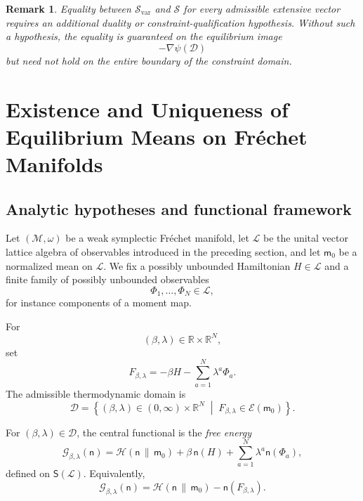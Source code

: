 \documentclass[11pt,reqno]{amsart}
\newtheorem{rem}[Theorem]{Remark}
\begin{document}
\begin{rem}
Equality between $\mathcal S_{\mathrm{var}}$ and $\mathcal S$ for every
admissible extensive vector requires an additional duality or
constraint-qualification hypothesis. Without such a hypothesis, the
equality is guaranteed on the equilibrium image
\[
-\nabla\psi(\mathcal D)
\]
but need not hold on the entire boundary of the constraint domain.
\end{rem}
\section{Existence and Uniqueness of Equilibrium Means on Fréchet Manifolds}

\subsection{Analytic hypotheses and functional framework}

Let $(\mathcal M,\omega)$ be a weak symplectic Fréchet manifold, let
$\mathcal L$ be the unital vector lattice algebra of observables
introduced in the preceding section, and let $\mathsf m_0$ be a
normalized mean on $\mathcal L$. We fix a possibly unbounded Hamiltonian
$H\in\mathcal L$ and a finite family of possibly unbounded observables
\[
\Phi_1,\ldots,\Phi_N\in\mathcal L,
\]
for instance components of a moment map.

For
\[
(\beta,\lambda)\in\mathbb R\times\mathbb R^N,
\]
set
\[
F_{\beta,\lambda}
=
-\beta H-\sum_{a=1}^{N}\lambda^a\Phi_a.
\]
The admissible thermodynamic domain is
\[
\mathcal D
=
\left\{
(\beta,\lambda)\in(0,\infty)\times\mathbb R^N
\;\middle|\;
F_{\beta,\lambda}\in\mathcal E(\mathsf m_0)
\right\}.
\]

For $(\beta,\lambda)\in\mathcal D$, the central functional is the
\emph{free energy}
\[
\mathcal G_{\beta,\lambda}(\mathsf n)
=
\mathcal H(\mathsf n\,\|\,\mathsf m_0)
+
\beta\,\mathsf n(H)
+
\sum_{a=1}^{N}\lambda^a\mathsf n(\Phi_a),
\]
defined on $\mathsf S(\mathcal L)$. Equivalently,
\[
\mathcal G_{\beta,\lambda}(\mathsf n)
=
\mathcal H(\mathsf n\,\|\,\mathsf m_0)
-
\mathsf n(F_{\beta,\lambda}).
\]
\end{document}
